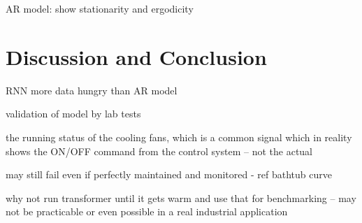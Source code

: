 \documentclass[]{article}
\begin{document}
AR model: show stationarity and ergodicity

\section{Discussion and Conclusion} \label{sec:conclusion}


RNN more data hungry than AR model

validation of model by lab tests

the running status of the cooling fans, which is a common signal which in reality shows the ON/OFF command from the control system -- not the actual 

may still fail even if perfectly maintained and monitored - ref bathtub curve

why not run transformer until it gets warm and use that for benchmarking -- may not be practicable or even possible in a real industrial application

\clearpage
\vspace{5mm}



\end{document}
